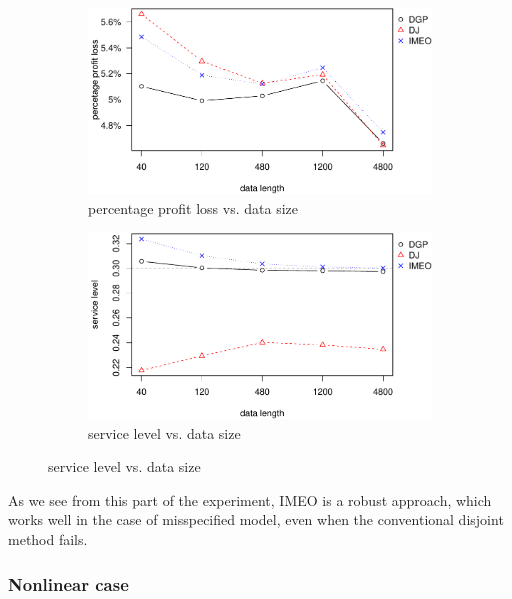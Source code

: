 \documentclass{article}
\begin{document}
\begin{figure}[ht]
\centering
\caption{Performance vs. sample size with Laplace distributed error term}
\begin{subfigure}[b]{0.48\textwidth}
\centering
\includegraphics[width=\textwidth]{laplaceppl.pdf}
\caption{percentage profit loss vs. data size}
\end{subfigure}
\hfill
\begin{subfigure}[b]{0.48\textwidth}
\centering
\includegraphics[width=\textwidth]{laplacesl.pdf}
\caption{service level vs. data size}
\end{subfigure}
\label{fig:err}
\end{figure}

As we see from this part of the experiment, IMEO is a robust approach, which works well in the case of misspecified model, even when the conventional disjoint method fails.


\subsubsection{Nonlinear case} \label{sub:exp4}
\end{document}
